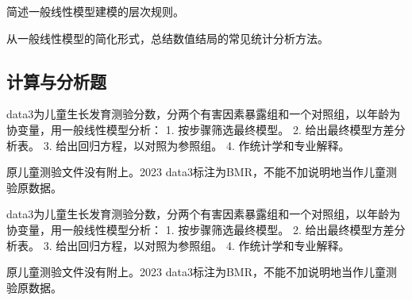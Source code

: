 \par\addvspace{6pt}\noindent\begin{minipage}{\linewidth}


简述一般线性模型建模的层次规则。



\end{minipage}\par\vspace{4pt}

\par\addvspace{6pt}\noindent\begin{minipage}{\linewidth}


从一般线性模型的简化形式，总结数值结局的常见统计分析方法。



\end{minipage}\par\vspace{4pt}

\subsection{计算与分析题}

\par\addvspace{6pt}\noindent\begin{minipage}{\linewidth}


data3为儿童生长发育测验分数，分两个有害因素暴露组和一个对照组，以年龄为协变量，用一般线性模型分析： 1. 按步骤筛选最终模型。 2. 给出最终模型方差分析表。 3. 给出回归方程，以对照为参照组。 4. 作统计学和专业解释。

原儿童测验文件没有附上。2023 data3标注为BMR，不能不加说明地当作儿童测验原数据。



\end{minipage}\par\vspace{4pt}

\par\addvspace{6pt}\noindent\begin{minipage}{\linewidth}


data3为儿童生长发育测验分数，分两个有害因素暴露组和一个对照组，以年龄为协变量，用一般线性模型分析： 1. 按步骤筛选最终模型。 2. 给出最终模型方差分析表。 3. 给出回归方程，以对照为参照组。 4. 作统计学和专业解释。

原儿童测验文件没有附上。2023 data3标注为BMR，不能不加说明地当作儿童测验原数据。



\end{minipage}\par\vspace{4pt}



